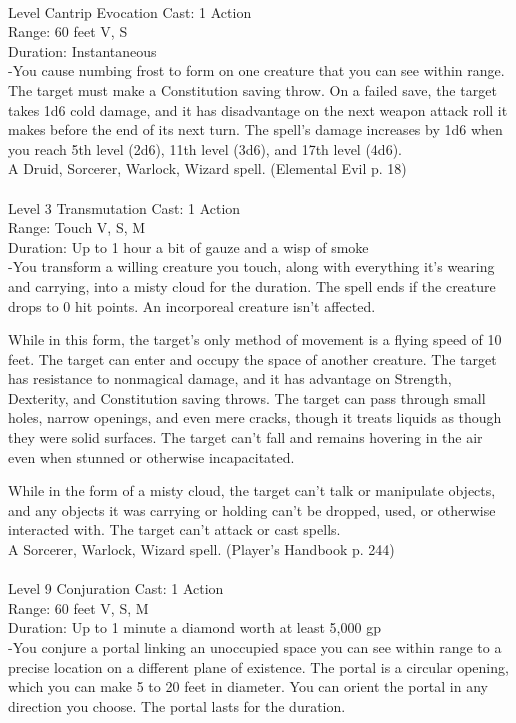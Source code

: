 \documentclass[10pt,twocolumn]{report}
\begin{document}
 \\
Level Cantrip \quad Evocation \quad Cast: 1 Action\\
Range: 60 feet \quad V, S\\
Duration: Instantaneous \quad \\
-You cause numbing frost to form on one creature that you can see within range. The target must make a Constitution saving throw. On a failed save, the target takes 1d6 cold damage, and it has disadvantage on the next weapon attack roll it makes before the end of its next turn.
The spell’s damage increases by 1d6 when you reach 5th level (2d6), 11th level (3d6), and 17th level (4d6).\\
A Druid, Sorcerer, Warlock, Wizard spell. (Elemental Evil p. 18) \\


 \\
Level 3 \quad Transmutation \quad Cast: 1 Action\\
Range: Touch \quad V, S, M\\
Duration: Up to 1 hour \quad a bit of gauze and a wisp of smoke\\
-You transform a willing creature you touch, along with everything it’s wearing and carrying, into a misty cloud for the duration. The spell ends if the creature drops to 0 hit points. An incorporeal creature isn’t affected.

While in this form, the target’s only method of movement is a flying speed of 10 feet. The target can enter and occupy the space of another creature. The target has resistance to nonmagical damage, and it has advantage on Strength, Dexterity, and Constitution saving throws. The target can pass through small holes, narrow openings, and even mere cracks, though it treats liquids as though they were solid surfaces. The target can’t fall and remains hovering in the air even when stunned or otherwise incapacitated.

While in the form of a misty cloud, the target can’t talk or manipulate objects, and any objects it was carrying or holding can’t be dropped, used, or otherwise interacted with. The target can’t attack or cast spells.\\
A Sorcerer, Warlock, Wizard spell. (Player's Handbook p. 244) \\


 \\
Level 9 \quad Conjuration \quad Cast: 1 Action\\
Range: 60 feet \quad V, S, M\\
Duration: Up to 1 minute \quad a diamond worth at least 5,000 gp\\
-You conjure a portal linking an unoccupied space you can see within range to a precise location on a different plane of existence. The portal is a circular opening, which you can make 5 to 20 feet in diameter. You can orient the portal in any direction you choose. The portal lasts for the duration.
\end{document}
